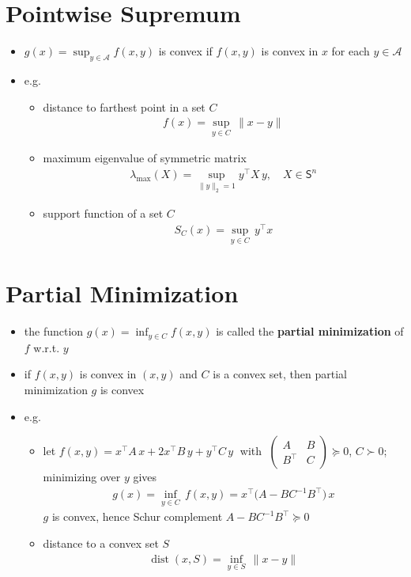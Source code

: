 \documentclass[11pt]{extarticle}
\newcommand{\ds}{\displaystyle}
\DeclareMathOperator*{\dist}{dist}
\theoremstyle{definition}
\begin{document}
\newpage

\section*{Pointwise Supremum}

\begin{itemize}
  \item $\ds g(x) = \sup_{y\in\mathcal{A}}f(x, y)$ is convex if $f(x, y)$ is convex in $x$ for each $y\in\mathcal{A}$
  \item e.g.
    \begin{itemize}
      \item distance to farthest point in a set $C$
        \begin{align*}
          f(x) = \sup_{y\in C}\,\|x - y\|
        \end{align*}
      \item maximum eigenvalue of symmetric matrix 
        \begin{align*}
          \lambda_{\text{max}}(X) = \sup_{\|y\|_2 = 1} y^\top X\,y, \quad X\in\mathsf{S}^n 
        \end{align*}
      \item support function of a set $C$
        \begin{align*}
          S_C(x) = \sup_{y\in C}\,y^\top x
        \end{align*}
    \end{itemize}
\end{itemize}

\newpage

\section*{Partial Minimization}

\begin{itemize}
  \item the function $\ds g(x) = \inf_{y\in C} f(x, y)$ is called the {\bf partial minimization} of $f$ w.r.t. $y$
  \item if $f(x, y)$ is convex in $(x, y)$ and $C$ is a convex set, then partial minimization $g$ is convex
  \item e.g.
    \begin{itemize}
      \item let $f(x, y) = x^\top A\,x + 2 x^\top B\,y + y^\top C\,y\;$ with $\ds\;\begin{pmatrix}A & B \\ B^\top & C\end{pmatrix}\succcurlyeq 0$, $C\succ 0$; minimizing over $y$ gives 
        \begin{align*}
          g(x) = \inf_{y\in C}\,f(x, y) = x^\top\big(A - BC^{-1}B^\top\big)\,x
        \end{align*}
        $g$ is convex, hence Schur complement $A - BC^{-1}B^\top\succcurlyeq 0$
      \item distance to a convex set $S$
        \begin{align*}
          \dist(x, S) = \inf_{y\in S}\,\|x - y\|
        \end{align*}
    \end{itemize}
\end{itemize}
\end{document}
